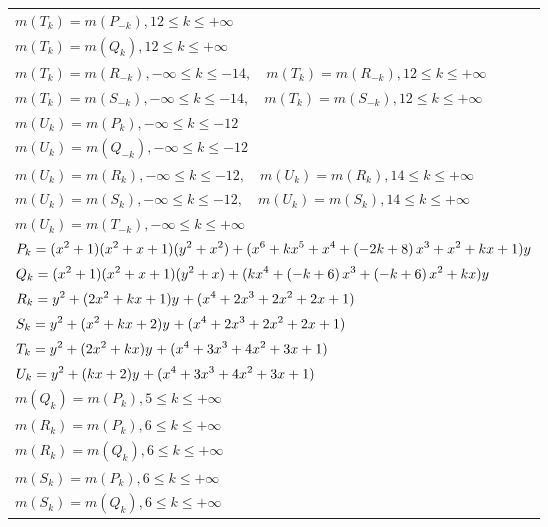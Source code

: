 \documentclass{amsart}
\begin{document}
\begin{longtable}{|l|}
\(\displaystyle m(T_k) = m(P_{-k}),12 \leqslant k \leqslant +\infty\)\\
\(\displaystyle m(T_k) = m(Q_{k}),12 \leqslant k \leqslant +\infty\)\\
\(\displaystyle m(T_k) = m(R_{-k}),-\infty \leqslant k \leqslant -14,\quad m(T_k) = m(R_{-k}),12 \leqslant k \leqslant +\infty\)\\
\(\displaystyle m(T_k) = m(S_{-k}),-\infty \leqslant k \leqslant -14,\quad m(T_k) = m(S_{-k}),12 \leqslant k \leqslant +\infty\)\\
\(\displaystyle m(U_k) = m(P_{k}),-\infty \leqslant k \leqslant -12\)\\
\(\displaystyle m(U_k) = m(Q_{-k}),-\infty \leqslant k \leqslant -12\)\\
\(\displaystyle m(U_k) = m(R_{k}),-\infty \leqslant k \leqslant -12,\quad m(U_k) = m(R_{k}),14 \leqslant k \leqslant +\infty\)\\
\(\displaystyle m(U_k) = m(S_{k}),-\infty \leqslant k \leqslant -12,\quad m(U_k) = m(S_{k}),14 \leqslant k \leqslant +\infty\)\\
\(\displaystyle m(U_k) = m(T_{-k}),-\infty \leqslant k \leqslant +\infty\)\\
\hline
\(\displaystyle P_k=(x^2
 + 1)(x^2
 + x
 + 1)(y^2+x^2)+(x^6
 + k\*x^5
 + x^4
 + \left(-2\*k
 + 8\right) \*x^3
 + x^2
 + k\*x
 + 1)y\)\\
\(\displaystyle Q_k=(x^2
 + 1)(x^2
 + x
 + 1)(y^2+x)+(k\*x^4
 + \left(-k
 + 6\right) \*x^3
 + \left(-k
 + 6\right) \*x^2
 + k\*x)y\)\\
\(\displaystyle R_k=y^{2}+(2\*x^2
 + k\*x
 + 1)y^{}+(x^4
 + 2\*x^3
 + 2\*x^2
 + 2\*x
 + 1)\)\\
\(\displaystyle S_k=y^{2}+(x^2
 + k\*x
 + 2)y^{}+(x^4
 + 2\*x^3
 + 2\*x^2
 + 2\*x
 + 1)\)\\
\(\displaystyle T_k=y^{2}+(2\*x^2
 + k\*x)y^{}+(x^4
 + 3\*x^3
 + 4\*x^2
 + 3\*x
 + 1)\)\\
\(\displaystyle U_k=y^{2}+(k\*x
 + 2)y^{}+(x^4
 + 3\*x^3
 + 4\*x^2
 + 3\*x
 + 1)\)\\
\(\displaystyle m(Q_k) = m(P_{k}),5 \leqslant k \leqslant +\infty\)\\
\(\displaystyle m(R_k) = m(P_{k}),6 \leqslant k \leqslant +\infty\)\\
\(\displaystyle m(R_k) = m(Q_{k}),6 \leqslant k \leqslant +\infty\)\\
\(\displaystyle m(S_k) = m(P_{k}),6 \leqslant k \leqslant +\infty\)\\
\(\displaystyle m(S_k) = m(Q_{k}),6 \leqslant k \leqslant +\infty\)\\

\end{longtable}
\end{document}
